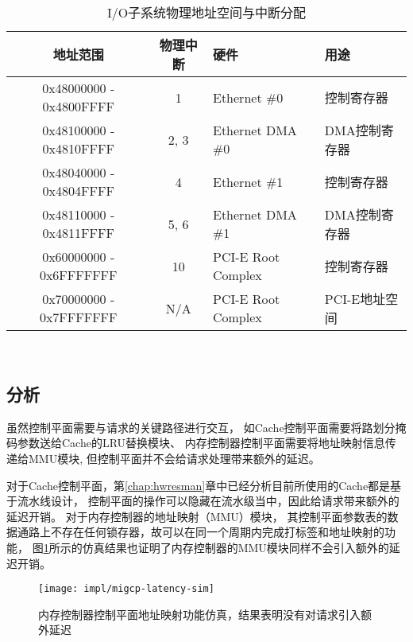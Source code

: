 \begin{table}[htb]
  \centering
  \begin{minipage}[t]{0.9\linewidth}
  \caption{I/O子系统物理地址空间与中断分配}
  \label{tab:pard-io-phyconfig}
    \begin{tabular*}{\linewidth}{ccll}
      \toprule[1.5pt]
      \textbf{地址范围} & \textbf{物理中断} & \textbf{硬件} & \textbf{用途} \\
      \midrule[1pt]
      0x48000000 - 0x4800FFFF & 1    & Ethernet \#0       & 控制寄存器    \\
      0x48100000 - 0x4810FFFF & 2, 3 & Ethernet DMA \#0   & DMA控制寄存器 \\
      0x48040000 - 0x4804FFFF & 4    & Ethernet \#1       & 控制寄存器    \\
      0x48110000 - 0x4811FFFF & 5, 6 & Ethernet DMA \#1   & DMA控制寄存器 \\
      0x60000000 - 0x6FFFFFFF & 10   & PCI-E Root Complex & 控制寄存器    \\
      0x70000000 - 0x7FFFFFFF & N/A  & PCI-E Root Complex & PCI-E地址空间 \\
      \bottomrule[1.5pt]
    \end{tabular*}\\[2pt]
  \end{minipage}
\end{table}


\subsection{分析}

虽然控制平面需要与请求的关键路径进行交互，
如Cache控制平面需要将路划分掩码参数送给Cache的LRU替换模块、
内存控制器控制平面需要将地址映射信息传递给MMU模块,
但控制平面并不会给请求处理带来额外的延迟。

对于Cache控制平面，第\ref{chap:hwresman}章中已经分析目前所使用的Cache都是基于流水线设计，
控制平面的操作可以隐藏在流水级当中，因此给请求带来额外的延迟开销。
对于内存控制器的地址映射（MMU）模块，
其控制平面参数表的数据通路上不存在任何锁存器，故可以在同一个周期内完成打标签和地址映射的功能，
图\ref{fig:migcp-latency-sim}所示的仿真结果也证明了内存控制器的MMU模块同样不会引入额外的延迟开销。

\begin{figure}[htb]
  \centering
  \texttt{[image: impl/migcp-latency-sim]}
  \caption[内存控制器控制平面地址映射功能仿真]{内存控制器控制平面地址映射功能仿真，结果表明没有对请求引入额外延迟}
  \label{fig:migcp-latency-sim}
\end{figure}


